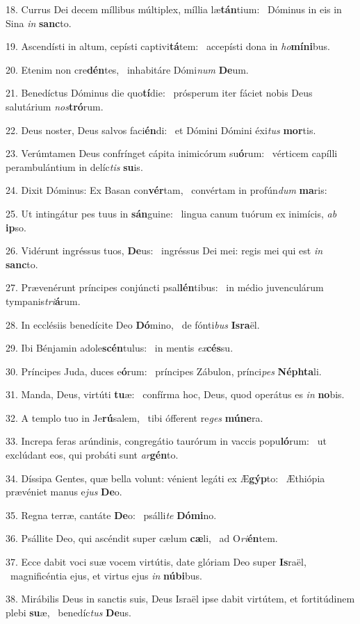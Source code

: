 18. Currus Dei decem míllibus múltiplex, míllia læ\textbf{tán}tium: \ast\  Dóminus in eis in Sina \textit{in} \textbf{sanc}to.\

19. Ascendísti in altum, cepísti captivi\textbf{tá}tem: \ast\  accepísti dona in \textit{ho}\textbf{mí}\textbf{ni}bus.\

20. Etenim non cre\textbf{dén}tes, \ast\  inhabitáre Dómi\textit{num} \textbf{De}um.\

21. Benedíctus Dóminus die quo\textbf{tí}die: \ast\  prósperum iter fáciet nobis Deus salutárium \textit{nos}\textbf{tró}rum.\

22. Deus noster, Deus salvos faci\textbf{én}di: \ast\  et Dómini Dómini éxi\textit{tus} \textbf{mor}tis.\

23. Verúmtamen Deus confrínget cápita inimicórum su\textbf{ó}rum: \ast\  vérticem capílli perambulántium in delíc\textit{tis} \textbf{su}is.\

24. Dixit Dóminus: Ex Basan con\textbf{vér}tam, \ast\  convértam in profún\textit{dum} \textbf{ma}ris:\

25. Ut intingátur pes tuus in \textbf{sán}guine: \ast\  lingua canum tuórum ex inimícis, \textit{ab} \textbf{ip}so.\

26. Vidérunt ingréssus tuos, \textbf{De}us: \ast\  ingréssus Dei mei: regis mei qui est \textit{in} \textbf{sanc}to.\

27. Prævenérunt príncipes conjúncti psal\textbf{lén}tibus: \ast\  in médio juvenculárum tympanis\textit{tri}\textbf{á}rum.\

28. In ecclésiis benedícite Deo \textbf{Dó}mino, \ast\  de fónti\textit{bus} \textbf{Is}\textbf{ra}ël.\

29. Ibi Bénjamin adole\textbf{scén}tulus: \ast\  in mentis \textit{ex}\textbf{cés}su.\

30. Príncipes Juda, duces e\textbf{ó}rum: \ast\  príncipes Zábulon, prínci\textit{pes} \textbf{Néph}\textbf{ta}li.\

31. Manda, Deus, virtúti \textbf{tu}æ: \ast\  confírma hoc, Deus, quod operátus es \textit{in} \textbf{no}bis.\

32. A templo tuo in Je\textbf{rú}salem, \ast\  tibi ófferent re\textit{ges} \textbf{mú}\textbf{ne}ra.\

33. Increpa feras arúndinis, congregátio taurórum in vaccis popu\textbf{ló}rum: \ast\  ut exclúdant eos, qui probáti sunt \textit{ar}\textbf{gén}to.\

34. Díssipa Gentes, quæ bella volunt: vénient legáti ex Æ\textbf{gýp}to: \ast\  Æthiópia prævéniet manus e\textit{jus} \textbf{De}o.\

35. Regna terræ, cantáte \textbf{De}o: \ast\  psálli\textit{te} \textbf{Dó}\textbf{mi}no.\

36. Psállite Deo, qui ascéndit super cælum \textbf{cæ}li, \ast\  ad O\textit{ri}\textbf{én}tem.\

37. Ecce dabit voci suæ vocem virtútis, date glóriam Deo super \textbf{Is}raël, \ast\  magnificéntia ejus, et virtus ejus \textit{in} \textbf{nú}\textbf{bi}bus.\

38. Mirábilis Deus in sanctis suis, Deus Israël ipse dabit virtútem, et fortitúdinem plebi \textbf{su}æ, \ast\  benedíc\textit{tus} \textbf{De}us.\

